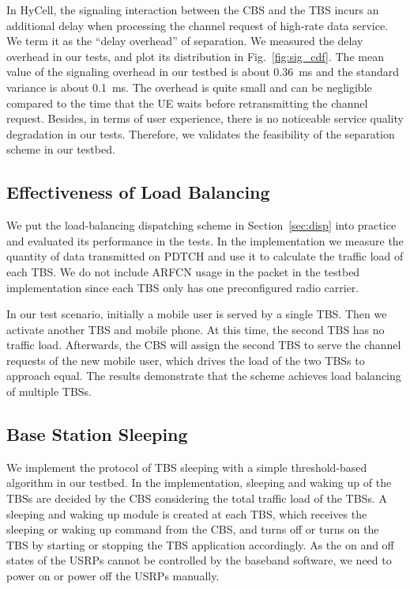 \documentclass[conference]{IEEEtran}
\begin{document}
In HyCell, the signaling interaction between the CBS and the TBS incurs an additional
delay when processing the channel request of high-rate data service. We term it as the
``delay overhead'' of separation. We measured the delay overhead in our
tests, and plot its distribution in Fig.~\ref{fig:sig_cdf}. The mean
value of the signaling overhead in our testbed is about \SI{0.36}{ms} and the
standard variance is about \SI{0.1}{ms}. The overhead is quite small and can be
negligible compared to the time that the UE waits before retransmitting the channel request.
Besides, in terms of user experience, there is no noticeable
service quality degradation in our tests.
Therefore, we validates the feasibility of
the separation scheme in our testbed.

\subsection{Effectiveness of Load Balancing}

We put the load-balancing dispatching scheme in Section~\ref{sec:disp} into practice and
evaluated its performance in the tests.
In the implementation we measure the quantity of
data transmitted on PDTCH and use it to calculate the traffic load of each TBS.
We do not include ARFCN usage in the packet in the testbed implementation
since each TBS only has one preconfigured radio carrier.

In our test scenario, initially a mobile user is served by
a single TBS. Then we activate another TBS and mobile phone.
At this time, the second TBS has no traffic load. Afterwards,
the CBS will assign the second TBS to
serve the channel requests of the new mobile user, which drives the load of the two TBSs to approach equal.
The results demonstrate that the scheme achieves load balancing of multiple TBSs.

\subsection{Base Station Sleeping}

We implement the protocol of TBS sleeping with a simple threshold-based
algorithm in our
testbed. In the implementation, sleeping and waking up of the TBSs are decided
by the CBS considering the total traffic load of the TBSs.
A sleeping and waking up module is created at each TBS, which receives the sleeping
or waking up command from the CBS, and turns off or turns on the TBS
by starting or stopping the TBS application accordingly.
As the on and off states of the USRPs cannot be controlled by the
baseband software, we need to power on or power off the USRPs manually.
\end{document}
